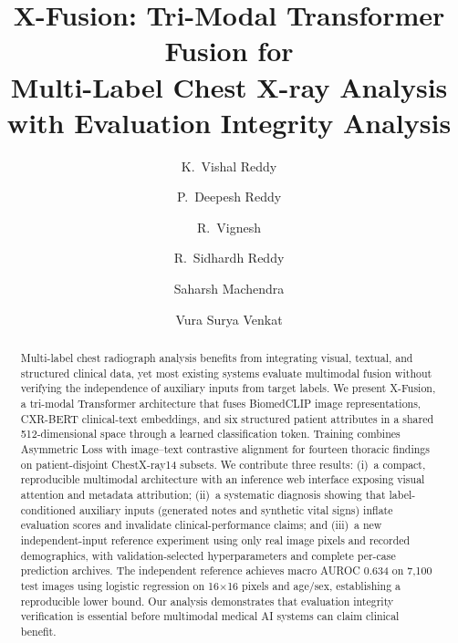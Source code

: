 \documentclass[runningheads,a4paper]{llncs}
\begin{document}
\title{X-Fusion: Tri-Modal Transformer Fusion for\\Multi-Label Chest X-ray Analysis\\with Evaluation Integrity Analysis}
\author{K.~Vishal Reddy \and P.~Deepesh Reddy \and R.~Vignesh \and R.~Sidhardh Reddy \and Saharsh Machendra \and Vura Surya Venkat}
\maketitle

\begin{abstract}
Multi-label chest radiograph analysis benefits from integrating visual, textual, and structured clinical data, yet most existing systems evaluate multimodal fusion without verifying the independence of auxiliary inputs from target labels.
We present X-Fusion, a tri-modal Transformer architecture that fuses BiomedCLIP image representations, CXR-BERT clinical-text embeddings, and six structured patient attributes in a shared 512-dimensional space through a learned classification token.
Training combines Asymmetric Loss with image--text contrastive alignment for fourteen thoracic findings on patient-disjoint ChestX-ray14 subsets.
We contribute three results: (i)~a compact, reproducible multimodal architecture with an inference web interface exposing visual attention and metadata attribution; (ii)~a systematic diagnosis showing that label-conditioned auxiliary inputs (generated notes and synthetic vital signs) inflate evaluation scores and invalidate clinical-performance claims; and (iii)~a new independent-input reference experiment using only real image pixels and recorded demographics, with validation-selected hyperparameters and complete per-case prediction archives.
The independent reference achieves macro AUROC 0.634 on 7{,}100 test images using logistic regression on 16$\times$16 pixels and age/sex, establishing a reproducible lower bound.
Our analysis demonstrates that evaluation integrity verification is essential before multimodal medical AI systems can claim clinical benefit.

\end{abstract}
\end{document}
